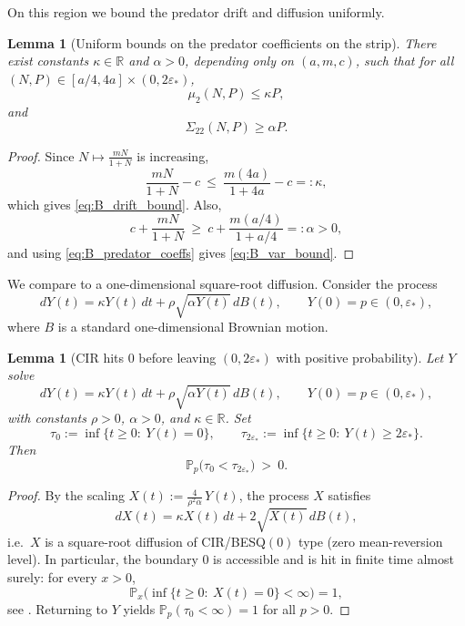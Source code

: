 \documentclass[pdflatex,sn-mathphys-ay]{sn-jnl}
\theoremstyle{thmstyleone}
\newtheorem{lemma}[theorem]{Lemma}
\theoremstyle{definition}
\theoremstyle{remark}
\begin{document}
\begin{appendices}
On this region we bound the predator drift and diffusion uniformly.

\begin{lemma}[Uniform bounds on the predator coefficients on the strip]\label{lem:B_pred_bounds}
There exist constants $\kappa\in\mathbb R$ and $\alpha>0$, depending only on $(a,m,c)$, such that for all
$(N,P)\in [a/4,4a]\times(0,2\varepsilon_*)$,
\begin{equation}\label{eq:B_drift_bound}
\mu_2(N,P)\le \kappa P,
\end{equation}
and
\begin{equation}\label{eq:B_var_bound}
\Sigma_{22}(N,P)\ge \alpha P.
\end{equation}
\end{lemma}

\begin{proof}
Since $N\mapsto \frac{mN}{1+N}$ is increasing,
\[
\frac{mN}{1+N}-c \ \le\ \frac{m(4a)}{1+4a}-c=: \kappa,
\]
which gives \eqref{eq:B_drift_bound}. Also,
\[
c+\frac{mN}{1+N}\ \ge\ c+\frac{m(a/4)}{1+a/4}=: \alpha>0,
\]
and using \eqref{eq:B_predator_coeffs} gives \eqref{eq:B_var_bound}.
\end{proof}

We compare to a one-dimensional square-root diffusion. Consider the process
\begin{equation}\label{eq:B_CIR_compare}
dY(t)=\kappa Y(t)\,dt+\rho\sqrt{\alpha Y(t)}\,dB(t),\qquad Y(0)=p\in(0,\varepsilon_*),
\end{equation}
where $B$ is a standard one-dimensional Brownian motion.

\begin{lemma}[CIR hits $0$ before leaving $(0,2\varepsilon_*)$ with positive probability]\label{lem:B_CIR_hit}
Let $Y$ solve
\[
dY(t)=\kappa Y(t)\,dt+\rho\sqrt{\alpha Y(t)}\,dB(t),\qquad Y(0)=p\in(0,\varepsilon_*),
\]
with constants $\rho>0$, $\alpha>0$, and $\kappa\in\mathbb R$. Set
\[
\tau_0:=\inf\{t\ge0:\ Y(t)=0\},\qquad
\tau_{2\varepsilon_*}:=\inf\{t\ge0:\ Y(t)\ge 2\varepsilon_*\}.
\]
Then
\[
\mathbb P_p\bigl(\tau_0<\tau_{2\varepsilon_*}\bigr)\ >\ 0.
\]
\end{lemma}

\begin{proof}
By the scaling $X(t):=\frac{4}{\rho^2\alpha}\,Y(t)$, the process $X$ satisfies
\[
dX(t)=\kappa X(t)\,dt+2\sqrt{X(t)}\,dB(t),
\]
i.e.\ $X$ is a square-root diffusion of CIR/BESQ$(0)$ type (zero mean-reversion level). In particular, the boundary
$0$ is accessible and is hit in finite time almost surely: for every $x>0$,
\[
\mathbb P_x\bigl(\inf\{t\ge0:\ X(t)=0\}<\infty\bigr)=1,
\]
see \citep{revuz_continuous_1999}. Returning to $Y$ yields $\mathbb P_p(\tau_0<\infty)=1$ for all $p>0$.


\end{proof}
\end{appendices}
\end{document}
